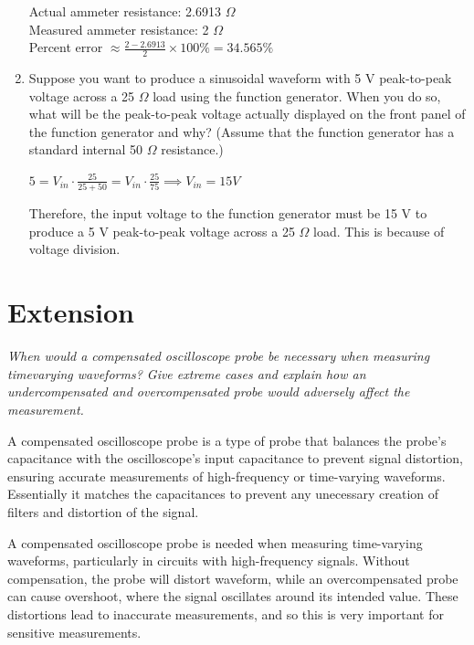 \documentclass[12pt]{article}
\begin{document}
\begin{enumerate}
Actual ammeter resistance: 2.6913 $\Omega$ \\
Measured ammeter resistance: 2 $\Omega$ \\
Percent error $\approx \frac{2 - 2.6913}{2} \times 100\% = 34.565\%$

\item Suppose you want to produce a sinusoidal waveform with 5 V peak-to-peak voltage across a 25 $\Omega$ load using the function generator. When you do so, what will be the peak-to-peak voltage actually displayed on the front panel of the function generator and why? (Assume that the function generator has a standard internal 50 $\Omega$ resistance.)

$5 = V_{in} \cdot \frac{25}{25 + 50} = V_{in} \cdot \frac{25}{75} \implies V_{in} = 15 V$

Therefore, the input voltage to the function generator must be 15 V to produce a 5 V peak-to-peak voltage across a 25 $\Omega$ load. 
This is because of voltage division.

\end{enumerate}

\section{Extension}

\textit{When would a compensated oscilloscope probe be necessary when measuring timevarying waveforms? Give extreme cases and explain how an undercompensated and
overcompensated probe would adversely affect the measurement.}

A compensated oscilloscope probe is a type of probe that balances the probe's capacitance with the oscilloscope's input capacitance to prevent signal distortion, ensuring accurate measurements of high-frequency or time-varying waveforms.
Essentially it matches the capacitances to prevent any unecessary creation of filters and distortion of the signal.

A compensated oscilloscope probe is needed when measuring time-varying waveforms, particularly in circuits with high-frequency signals. Without compensation, the probe will distort waveform, while an overcompensated probe can cause overshoot, where the signal oscillates around its intended value. These distortions lead to inaccurate measurements, and so this is very important for sensitive measurements.
\end{document}
